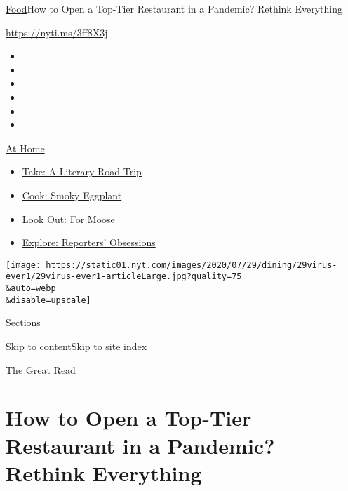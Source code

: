 \href{/section/food}{Food}\textbar{}How to Open a Top-Tier Restaurant in
a Pandemic? Rethink Everything

\url{https://nyti.ms/3ff8X3j}

\begin{itemize}
\item
\item
\item
\item
\item
\item
\end{itemize}

\href{https://www.nytimes.com/spotlight/at-home?action=click\&pgtype=Article\&state=default\&region=TOP_BANNER\&context=at_home_menu}{At
Home}

\begin{itemize}
\tightlist
\item
  \href{https://www.nytimes.com/2020/07/28/books/time-for-a-literary-road-trip.html?action=click\&pgtype=Article\&state=default\&region=TOP_BANNER\&context=at_home_menu}{Take:
  A Literary Road Trip}
\item
  \href{https://www.nytimes.com/2020/07/29/magazine/bored-with-your-home-cooking-some-smoky-eggplant-will-fix-that.html?action=click\&pgtype=Article\&state=default\&region=TOP_BANNER\&context=at_home_menu}{Cook:
  Smoky Eggplant}
\item
  \href{https://www.nytimes.com/2020/07/27/travel/moose-michigan-isle-royale.html?action=click\&pgtype=Article\&state=default\&region=TOP_BANNER\&context=at_home_menu}{Look
  Out: For Moose}
\item
  \href{https://www.nytimes.com/interactive/2020/at-home/even-more-reporters-editors-diaries-lists-recommendations.html?action=click\&pgtype=Article\&state=default\&region=TOP_BANNER\&context=at_home_menu}{Explore:
  Reporters' Obsessions}
\end{itemize}

\texttt{[image: https://static01.nyt.com/images/2020/07/29/dining/29virus-ever1/29virus-ever1-articleLarge.jpg?quality=75\\\&auto=webp\\\&disable=upscale]}

Sections

\protect\hyperlink{site-content}{Skip to
content}\protect\hyperlink{site-index}{Skip to site index}

The Great Read

\hypertarget{how-to-open-a-top-tier-restaurant-in-a-pandemic-rethink-everything}{%
\section{How to Open a Top-Tier Restaurant in a Pandemic? Rethink
Everything}\label{how-to-open-a-top-tier-restaurant-in-a-pandemic-rethink-everything}}

